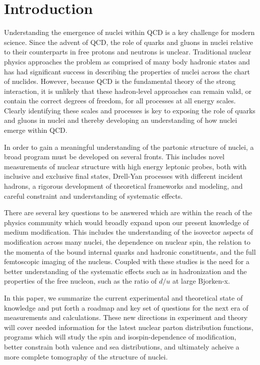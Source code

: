 \section{Introduction}


Understanding the emergence of nuclei within QCD is a key challenge for modern science.  Since the advent of QCD, the role of quarks and gluons in nuclei relative to their counterparts in free protons and neutrons is unclear.  Traditional nuclear physics approaches the problem as comprised of many body hadronic states and has had significant success in describing the properties of nuclei across the chart of nuclides. However, because QCD is the fundamental theory of the strong interaction, it is unlikely that these hadron-level approaches can remain valid, or contain the correct degrees of freedom, for all processes at all energy scales. Clearly identifying these scales and processes is key to exposing the role of quarks and gluons in nuclei and thereby developing an understanding of how nuclei emerge within QCD.

In order to gain a meaningful understanding of the partonic structure of nuclei, a broad program must be developed on several fronts.  This includes novel measurements of nuclear structure with high energy leptonic probes, both with inclusive and exclusive final states, Drell-Yan processes with different incident hadrons, a rigorous development of theoretical frameworks and modeling, and  careful constraint and understanding of systematic effects.

There are several key questions to be answered which are within the reach of the physics community which would broadly expand upon our present knowledge of medium modification.  This includes the understanding of the isovector aspects of modification across many nuclei, the dependence on nuclear spin, the relation to the momenta of the bound internal quarks and hadronic constituents, and the full femtoscopic imaging of the nucleus.  Coupled with these studies is the need for a better understanding of the systematic effects such as in hadronization and the properties of the free nucleon, such as the ratio of $d/u$ at large Bjorken-x. 

In this paper, we summarize the current experimental and theoretical state of knowledge and put forth a roadmap and key set of questions for the next era of measurements and calculations.  These new directions in experiment and theory will cover needed information for the latest nuclear parton distribution functions, programs which will study the spin and isospin-dependence of modification, better constrain both valence and sea distributions, and ultimately acheive a more complete tomography of the structure of nuclei.

